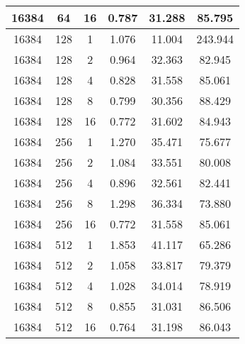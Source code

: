 \begin{longtable}{|c|c|c|c|c|c|}
\hline
16384 & 64 & 16 & 0.787 & 31.288 & 85.795 \\
\hline
16384 & 128 & 1 & 1.076 & 11.004 & 243.944 \\
\hline
16384 & 128 & 2 & 0.964 & 32.363 & 82.945 \\
\hline
16384 & 128 & 4 & 0.828 & 31.558 & 85.061 \\
\hline
16384 & 128 & 8 & 0.799 & 30.356 & 88.429 \\
\hline
16384 & 128 & 16 & 0.772 & 31.602 & 84.943 \\
\hline
16384 & 256 & 1 & 1.270 & 35.471 & 75.677 \\
\hline
16384 & 256 & 2 & 1.084 & 33.551 & 80.008 \\
\hline
16384 & 256 & 4 & 0.896 & 32.561 & 82.441 \\
\hline
16384 & 256 & 8 & 1.298 & 36.334 & 73.880 \\
\hline
16384 & 256 & 16 & 0.772 & 31.558 & 85.061 \\
\hline
16384 & 512 & 1 & 1.853 & 41.117 & 65.286 \\
\hline
16384 & 512 & 2 & 1.058 & 33.817 & 79.379 \\
\hline
16384 & 512 & 4 & 1.028 & 34.014 & 78.919 \\
\hline
16384 & 512 & 8 & 0.855 & 31.031 & 86.506 \\
\hline
16384 & 512 & 16 & 0.764 & 31.198 & 86.043 \\
\hline
\end{longtable}